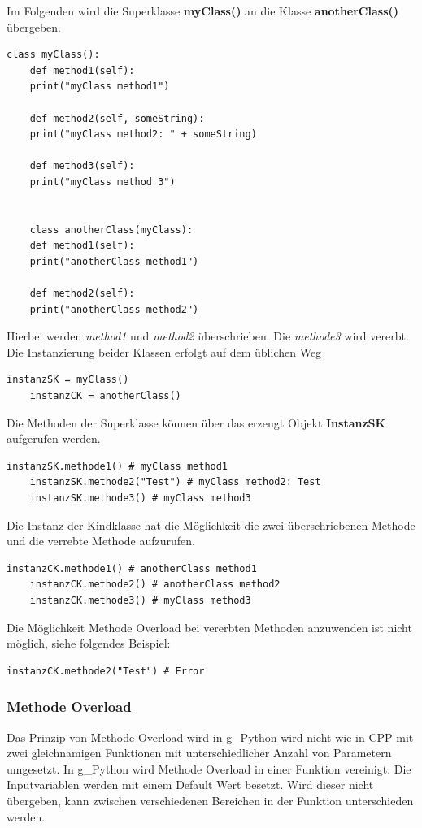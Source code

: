 Im Folgenden wird die Superklasse \textbf{myClass()} an die Klasse \textbf{anotherClass()} übergeben.
\begin{lstlisting}[style=python]
	class myClass():
	def method1(self):
	print("myClass method1")
	
	def method2(self, someString):
	print("myClass method2: " + someString)
	
	def method3(self):
	print("myClass method 3")
	
	
	class anotherClass(myClass):
	def method1(self):
	print("anotherClass method1")
	
	def method2(self):
	print("anotherClass method2")
\end{lstlisting}
Hierbei werden \textit{method1} und \textit{method2} überschrieben. Die \textit{methode3} wird vererbt. 
Die Instanzierung beider Klassen erfolgt auf dem üblichen Weg
\begin{lstlisting}[style=python]
	instanzSK = myClass()
	instanzCK = anotherClass()
\end{lstlisting}
Die Methoden der Superklasse können über das erzeugt Objekt \textbf{InstanzSK} aufgerufen werden.
\begin{lstlisting}[style=python]
	instanzSK.methode1() # myClass method1
	instanzSK.methode2("Test") # myClass method2: Test
	instanzSK.methode3() # myClass method3
\end{lstlisting}
Die Instanz der Kindklasse hat die Möglichkeit die zwei überschriebenen Methode und die verrebte Methode aufzurufen.
\begin{lstlisting}[style=python]
	instanzCK.methode1() # anotherClass method1
	instanzCK.methode2() # anotherClass method2
	instanzCK.methode3() # myClass method3
\end{lstlisting}
Die Möglichkeit Methode Overload bei vererbten Methoden anzuwenden ist nicht möglich, siehe folgendes Beispiel:
\begin{lstlisting}[style=python]
	instanzCK.methode2("Test") # Error
\end{lstlisting}


\subsubsection{Methode Overload}
Das Prinzip von Methode Overload wird in \gls{g_Python} wird nicht wie in \gls{CPP} mit zwei gleichnamigen Funktionen mit unterschiedlicher Anzahl von Parametern umgesetzt. In \gls{g_Python} wird Methode Overload in einer Funktion vereinigt. Die Inputvariablen werden mit einem Default Wert besetzt. Wird dieser nicht übergeben, kann zwischen verschiedenen Bereichen in der Funktion unterschieden werden.\\

